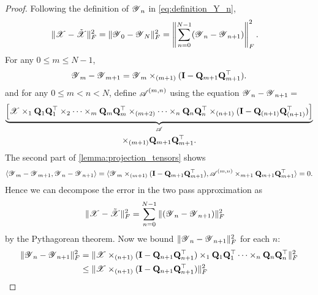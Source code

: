 \begin{lem}
\begin{proof}
Following the definition of $\T{Y}_n$ in \ref{eq:definition_Y_n},
\begin{equation}\label{eq: y_diff}
\begin{aligned}
& \|\T{X}-\tilde{\T{X}}\|_F^2 = \|\T{Y}_0 - \T{Y}_N\|_F^2= \left\|\sum_{n=0}^{N-1} (\T{Y}_n - \T{Y}_{n+1})\right\|_F^2.
\end{aligned}
\end{equation}
For any $0 \leq m \leq N-1$,
\begin{equation}
\T{Y}_m-\T{Y}_{m+1} = \T{Y}_{m} \times_{(m+1)} (\mathbf{I} - \mathbf{Q}_{m+1}\mathbf{Q}^\top_{m+1}). \nonumber
\end{equation}
and for any $0\le m< n < N$, define $\T{A}^{(m,n)}$ using the equation
$\T{Y}_n - \T{Y}_{n+1} =$
\begin{multline}
\underbrace{\left[\T{X}\times_1 \mathbf{Q}_{1}\mathbf{Q}^\top_{1} \times_2 \cdots \times_{m} \mathbf{Q}_{m}\mathbf{Q}^\top_{m}\times_{(m+2)} \cdots  \times_{n} \mathbf{Q}_{n}\mathbf{Q}^\top_{n}\times_{(n+1)}(\mathbf{I}-\mathbf{Q}_{(n+1)}\mathbf{Q}^\top_{(n+1)})\right]}_{\T{A}}\\
	\times_{(m+1)} \mathbf{Q}_{m+1}\mathbf{Q}^\top_{m+1}.\nonumber
\end{multline}
The second part of \ref{lemma:projection_tensors} shows
\begin{equation}\label{eq:inner_prod1}
\langle\T{Y}_m-\T{Y}_{m+1},  \T{Y}_n - \T{Y}_{n+1}\rangle = \langle\T{Y}_{m} \times_{(m+1)} (\mathbf{I} - \mathbf{Q}_{m+1}\mathbf{Q}^\top_{m+1}), \T{A}^{(m,n)} \times_{m+1} \mathbf{Q}_{m+1}\mathbf{Q}^\top_{m+1} \rangle = 0.\nonumber
\end{equation}
Hence we can decompose the error in the two pass approximation as
\begin{equation}
\label{eq:comression_decomposition}
\begin{aligned}
& \|\T{X}-\tilde{\T{X}}\|_F^2 =  \sum_{n=0}^{N-1} \| (\T{Y}_n - \T{Y}_{n+1})\|_F^2
\end{aligned}
\end{equation}
by the Pythagorean theorem.
Now we bound $\|\T{Y}_n - \T{Y}_{n+1}\|_F^2$ for each $n$:
\begin{equation} \label{eq: y_diff_bound}
\begin{aligned}
\|\T{Y}_n - \T{Y}_{n+1}\|_F^2 &= \|\T{X}\times_{(n+1)} (\mathbf{I} - \mathbf{Q}_{n+1}\mathbf{Q}_{n+1}^\top)\times_{1} \mathbf{Q}_{1}\mathbf{Q}_{1}^\top\dots \times_n \mathbf{Q}_{n}\mathbf{Q}_{n}^\top\|_F^2 \\
&\le \|\T{X}\times_{(n+1)} (\mathbf{I} - \mathbf{Q}_{n+1}\mathbf{Q}_{n+1}^\top)\|_F^2 \\

\end{aligned}
\end{equation}
\end{proof}
\end{lem}
